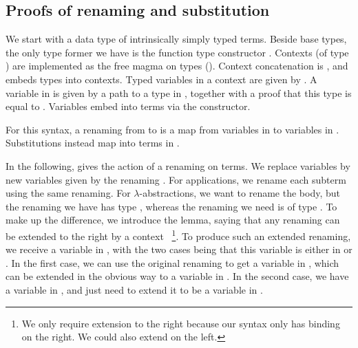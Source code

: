 \subsection{Proofs of renaming and substitution}

We start with a data type  of intrinsically simply typed
terms.
Beside base types, the only type former we have is the function type constructor
.
Contexts (of type ) are implemented as the free magma on types
().
Context concatenation is , and 
embeds types into contexts.
Typed variables in a context are given by .
A variable in
\AgdaBound{$\Gamma$}\AgdaSpace{}\AgdaRecord{$\ni$}\AgdaSpace{}
is given by a path  to a type in \AgdaBound{$\Gamma$}, together
with a proof  that this type is equal to .
Variables embed into terms via the  constructor.

\Var{}
\Term{}

For this syntax, a renaming from \AgdaBound{$\Gamma$} to \AgdaBound{$\Delta$}
is a map from variables in \AgdaBound{$\Delta$} to variables in
\AgdaBound{$\Gamma$}.
Substitutions instead map into terms in \AgdaBound{$\Gamma$}.

\Ren{}
\Sub{}

In the following,  gives the action of a renaming on terms.
We replace variables by new variables given by the renaming \AgdaBound{$\rho$}.
For applications, we rename each subterm using the same renaming.
For $\lambda$-abstractions, we want to rename the body, but the renaming we
have has type \RenGD{}, whereas the renaming we need is of type \RenGADA{}.
To make up the difference, we introduce the  lemma,
saying that any renaming can be extended to the right by a context
\AgdaBound{$\Theta$}~\footnote{%
  We only require extension to the right because our syntax only has binding
  on the right.
  We could also extend on the left.
}.
To produce such an extended renaming, we receive a variable in \DTh{}, with the
two cases being that this variable is either in \AgdaBound{$\Delta$} or
\AgdaBound{$\Theta$}.
In the first case, we can use the original renaming \AgdaBound{$\rho$} to get
a variable in \AgdaBound{$\Gamma$}, which can be extended in the obvious way
to a variable in \GTh{}.
In the second case, we have a variable in \AgdaBound{$\Theta$}, and just need
to extend it to be a variable in \GTh{}.

